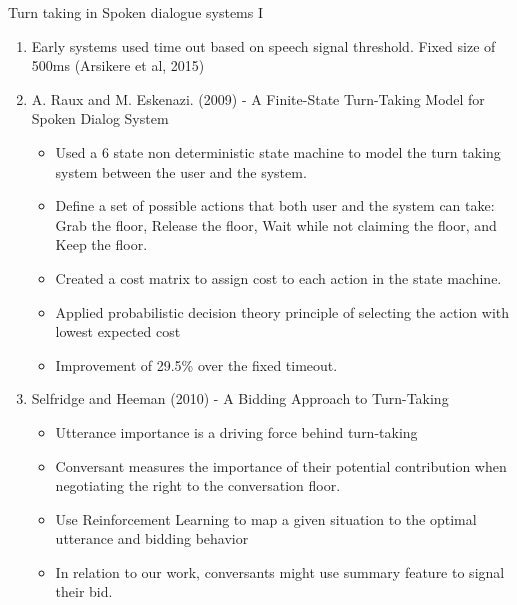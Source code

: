 \begin{frame} {Turn taking in Spoken dialogue systems I }
   \begin{enumerate}
         \item Early systems used time out based on speech signal threshold. Fixed size of 500ms (Arsikere et al, 2015)
         \item A. Raux and M. Eskenazi. (2009) - A Finite-State Turn-Taking Model for Spoken Dialog System
             \begin{itemize}
                \item Used a 6 state non deterministic state machine to model the turn taking system between the user and the system.
                \item Define a set of possible actions that both user and the system can take:
                      Grab the floor, Release the floor, Wait while not claiming the floor, and Keep
                      the floor.   
                \item Created a cost matrix to assign cost to each action in the state machine.
                \item Applied probabilistic decision theory principle of selecting the action with lowest expected cost
                \item Improvement of 29.5\% over the fixed timeout.    
             \end{itemize}  
         \item Selfridge and Heeman (2010) - A Bidding Approach to Turn-Taking
         \begin{itemize}
            \item Utterance importance is a driving force behind turn-taking
            \item Conversant measures the importance of their potential contribution when negotiating
                  the right to the conversation floor.
            \item Use Reinforcement Learning to map a given situation to the optimal utterance and bidding behavior  
             \item In relation to our work, conversants might use summary feature to signal their bid.        
         \end{itemize}
                 
   \end{enumerate}
 \end{frame}

